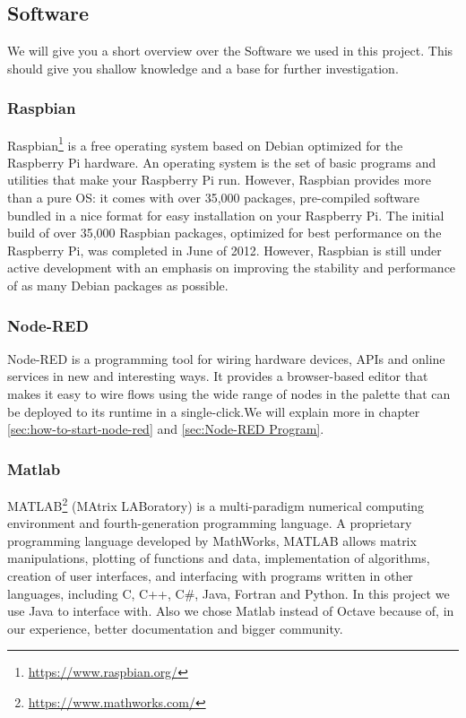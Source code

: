 \documentclass[12pt]{article}
\begin{document}
\newpage

\subsection{Software}
We will give you a short overview over the Software we used in this project. This should give you shallow knowledge and a base for further investigation. 
\subsubsection{Raspbian}

Raspbian\footnote{\url{https://www.raspbian.org/}} is a free operating system based on Debian optimized for the Raspberry Pi hardware. An operating system is the set of basic programs and utilities that make your Raspberry Pi run. However, Raspbian provides more than a pure OS: it comes with over 35,000 packages, pre-compiled software bundled in a nice format for easy installation on your Raspberry Pi.
The initial build of over 35,000 Raspbian packages, optimized for best performance on the Raspberry Pi, was completed in June of 2012. However, Raspbian is still under active development with an emphasis on improving the stability and performance of as many Debian packages as possible.

\subsubsection{Node-RED}

Node-RED is a programming tool for wiring hardware devices, APIs and online services in new and interesting ways.
It provides a browser-based editor that makes it easy to wire flows using the wide range of nodes in the palette that can be deployed to its runtime in a single-click.We will explain more in chapter \ref{sec:how-to-start-node-red} and \ref{sec:Node-RED Program}.

\subsubsection{Matlab}

MATLAB\footnote{\url{https://www.mathworks.com/}} (MAtrix LABoratory) is a multi-paradigm numerical computing environment and fourth-generation programming language. A proprietary programming language developed by MathWorks, MATLAB allows matrix manipulations, plotting of functions and data, implementation of algorithms, creation of user interfaces, and interfacing with programs written in other languages, including C, C++, C\#, Java, Fortran and Python. In this project we use Java to interface with. Also we chose Matlab instead of Octave because of, in our experience, better documentation and bigger community.
\end{document}

